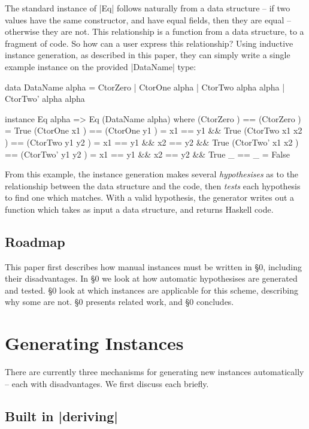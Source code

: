 \documentclass{llncs}
\begin{document}
The standard instance of |Eq| follows naturally from a data structure -- if two values have the same constructor, and have equal fields, then they are equal -- otherwise they are not. This relationship is a function from a data structure, to a fragment of code. So how can a user express this relationship? Using inductive instance generation, as described in this paper, they can simply write a single example instance on the provided |DataName| type:

\begin{code}
data DataName alpha  =  CtorZero
                     |  CtorOne   alpha
                     |  CtorTwo   alpha alpha
                     |  CtorTwo'  alpha alpha

instance Eq alpha => Eq (DataName alpha) where
    (CtorZero         )  == (CtorZero         )  = True
    (CtorOne   x1     )  == (CtorOne   y1     )  = x1 == y1 && True
    (CtorTwo   x1 x2  )  == (CtorTwo   y1 y2  )  = x1 == y1 && x2 == y2 && True
    (CtorTwo'  x1 x2  )  == (CtorTwo'  y1 y2  )  = x1 == y1 && x2 == y2 && True
    _                    == _                    = False
\end{code}

From this example, the instance generation makes several \textit{hypothesises} as to the relationship between the data structure and the code, then \textit{tests} each hypothesis to find one which matches. With a valid hypothesis, the generator writes out a function which takes as input a data structure, and returns Haskell code.

\subsection{Roadmap}

This paper first describes how manual instances must be written in \S0, including their disadvantages. In \S0 we look at how automatic hypothesises are generated and tested. \S0 look at which instances are applicable for this scheme, describing why some are not. \S0 presents related work, and \S0 concludes.


\section{Generating Instances}

There are currently three mechanisms for generating new instances automatically -- each with disadvantages. We first discuss each briefly.

\subsection{Built in |deriving|}
\end{document}
